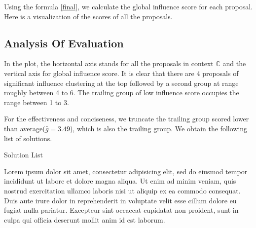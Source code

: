 Using the formula \ref{final}, we calculate the global influence score for each proposal. Here is a visualization of the scores of all the proposals.

\begin{figure}[ht]
\centering
{}
\end{figure}

\subsection{Analysis Of Evaluation}

In the plot, the horizontal axis stands for all the proposals in context $\mathbb{C}$ and the vertical axis for global influence score. It is clear that there are 4 proposals of significant influence clustering at the top followed by a second group at range roughly between 4 to 6. The trailing group of low influence score occupies the range between 1 to 3.

For the effectiveness and conciseness, we truncate the trailing group scored lower than average($\bar{g}=3.49$), which is also the trailing group. We obtain the following list of solutions.

\begin{table}[ht]
\caption{Solution List}
\label{tab:solution}
\end{table}

Lorem ipsum dolor sit amet, consectetur adipisicing elit, sed do eiusmod
tempor incididunt ut labore et dolore magna aliqua. Ut enim ad minim veniam,
quis nostrud exercitation ullamco laboris nisi ut aliquip ex ea commodo
consequat. Duis aute irure dolor in reprehenderit in voluptate velit esse
cillum dolore eu fugiat nulla pariatur. Excepteur sint occaecat cupidatat non
proident, sunt in culpa qui officia deserunt mollit anim id est laborum.